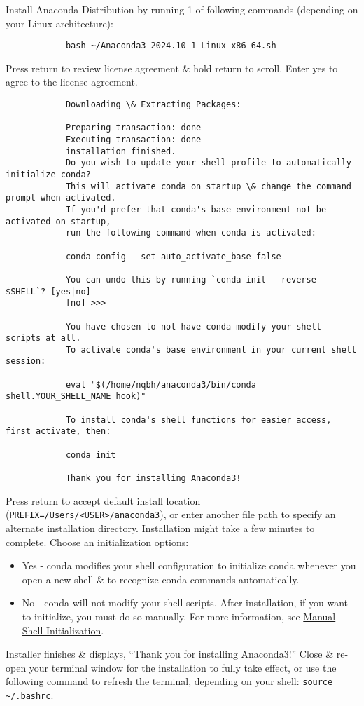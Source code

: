 \documentclass{article}
\begin{document}
\begin{itemize}
\begin{itemize}
		Install Anaconda Distribution by running 1 of following commands (depending on your Linux architecture):
		\begin{verbatim}
			bash ~/Anaconda3-2024.10-1-Linux-x86_64.sh
		\end{verbatim}
		Press return to review license agreement \& hold return to scroll. Enter yes to agree to the license agreement.
		\begin{verbatim}
			Downloading \& Extracting Packages:
			
			Preparing transaction: done
			Executing transaction: done
			installation finished.
			Do you wish to update your shell profile to automatically initialize conda?
			This will activate conda on startup \& change the command prompt when activated.
			If you'd prefer that conda's base environment not be activated on startup,
			run the following command when conda is activated:
			
			conda config --set auto_activate_base false
			
			You can undo this by running `conda init --reverse $SHELL`? [yes|no]
			[no] >>>
			
			You have chosen to not have conda modify your shell scripts at all.
			To activate conda's base environment in your current shell session:
			
			eval "$(/home/nqbh/anaconda3/bin/conda shell.YOUR_SHELL_NAME hook)" 
			
			To install conda's shell functions for easier access, first activate, then:
			
			conda init
			
			Thank you for installing Anaconda3!
		\end{verbatim}
		Press return to accept default install location (\verb|PREFIX=/Users/<USER>/anaconda3|), or enter another file path to specify an alternate installation directory. Installation might take a few minutes to complete. Choose an initialization options:
		\begin{itemize}
			\item Yes - conda modifies your shell configuration to initialize conda whenever you open a new shell \& to recognize conda commands automatically.
			\item No - conda will not modify your shell scripts. After installation, if you want to initialize, you must do so manually. For more information, see \href{https://docs.anaconda.com/anaconda/install/#manual-shell-init-linux}{Manual Shell Initialization}.
		\end{itemize}
		Installer finishes \& displays, ``Thank you for installing Anaconda3!'' Close \& re-open your terminal window for the installation to fully take effect, or use the following command to refresh the terminal, depending on your shell: \verb|source ~/.bashrc|.
		

\end{itemize}
\end{itemize}
\end{document}
